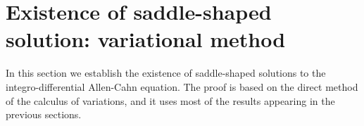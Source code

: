 \documentclass[12pt,reqno]{amsart}
\theoremstyle{definition}
\theoremstyle{remark}
\numberwithin{equation}{section}
\begin{document}
\section{Existence of saddle-shaped solution: variational method}
\label{Sec:Existence}


In this section we establish the existence of saddle-shaped solutions to the integro-differential Allen-Cahn equation. The proof is based on the direct method of the calculus of variations, and it uses most of the results appearing in the previous sections.
\end{document}
